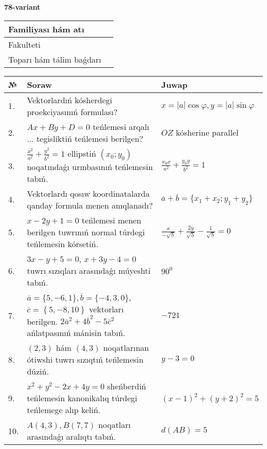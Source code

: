 \documentclass{article}
\begin{document}
\egroup

\newpage


\textbf{78-variant}\\

\bgroup
\def\arraystretch{1.6} %

\begin{tabular}{|m{5.7cm}|m{9.5cm}|}
\hline
Familiyası hám atı & \\
\hline
Fakulteti  & \\
\hline
Toparı hám tálim baǵdarı  & \\
\hline
\end{tabular}

\vspace{1cm}

\begin{tabular}{|m{0.7cm}|m{10cm}|m{4cm}|}
\hline
№ & Soraw & Juwap \\
\hline
1. & Vektorlardıń kósherdegi proekciyasınıń formulası? & $x=|a|\cos\varphi, y=|a|\sin\varphi$ \\
\hline
2. & $Ax+By+D=0$ teńlemesi arqalı ... tegisliktiń teńlemesi berilgen? & $OZ$ kósherine parallel \\
\hline
3. & $\frac{x^2}{a^2}+\frac{y^2}{b^2}=1$ ellipstiń $(x_0;y_0)$ noqatındaǵı urınbasınıń teńlemesin tabıń. & $\frac{x_0x}{a^2}+\frac{y_0y}{b^2}=1$ \\
\hline
4. & Vektorlardı qosıw koordinatalarda qanday formula menen anıqlanadı? & $\overline{a}+\overline{b}=\{x_1+x_2;y_1+y_2\}$ \\
\hline
5. & $x-2y+1=0$ teńlemesi menen berilgen tuwrınıń normal túrdegi teńlemesin kórsetiń. & $\frac{x}{- \sqrt{5}}+\frac{2y}{\sqrt{5}}-\frac{1}{\sqrt{5}}=0$ \\
\hline
6. & $3x-y+5=0$, $x+3y-4=0$ tuwrı sızıqları arasındaǵı múyeshti tabıń. & $90^{0}$ \\
\hline
7. & $\overline{a}=\{5,-6, 1 \}, \overline{b}=\{-4, 3, 0 \} $, $\overline{c}=\left\{ 5,-8, 10 \right\}$ vektorları berilgen. $2{\overline{a}}^{2}+4{\overline{b}}^{2}-5{\overline{c}}^{2}$ ańlatpasınıń mánisin tabıń. & $-721$ \\
\hline
8. & $(2, 3)$ hám $(4, 3)$ noqatlarınan ótiwshi tuwrı sızıqtıń teńlemesin dúziń. & $ y-3=0$ \\
\hline
9. & $x^{2}+y^{2}-2x+4y=0$ sheńberdiń teńlemesin kanonikalıq túrdegi teńlemege alıp keliń. & $(x-1)^{2}+(y+2)^{2}=5$ \\
\hline
10. & $A(4, 3), B(7, 7)$ noqatları arasındaǵı aralıqtı tabıń. & $d(AB)=5$ \\
\hline
\end{tabular}
\end{document}
